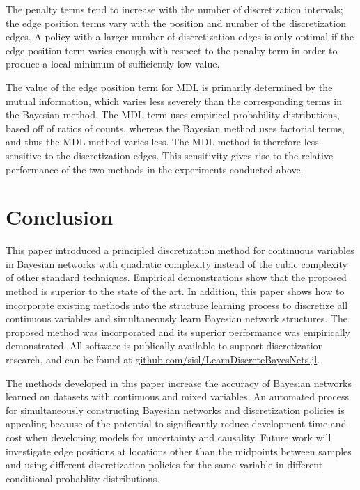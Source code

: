The penalty terms tend to increase with the number of discretization intervals; the edge position terms vary with the position and number of the discretization edges.
A policy with a larger number of discretization edges is only optimal if the edge position term varies enough with respect to the penalty term in order to produce a local minimum of sufficiently low value.

The value of the edge position term for MDL is primarily determined by the mutual information, which varies less severely than the corresponding terms in the Bayesian method.
The MDL term uses empirical probability distributions, based off of ratios of counts, whereas the Bayesian method uses factorial terms, and thus the MDL method varies less.
The MDL method is therefore less sensitive to the discretization edges.
This sensitivity gives rise to the relative performance of the two methods in the experiments conducted above.

\section{Conclusion}
This paper introduced a principled discretization method for continuous variables in Bayesian networks with quadratic complexity instead of the cubic complexity of other standard techniques.
Empirical demonstrations show that the proposed method is superior to the state of the art.
In addition, this paper shows how to incorporate existing methods into the structure learning process to discretize all continuous variables and simultaneously learn Bayesian network structures.
The proposed method was incorporated and its superior performance was empirically demonstrated.
All software is publically available to support discretization research, and can be found at \url{github.com/sisl/LearnDiscreteBayesNets.jl}.

The methods developed in this paper increase the accuracy of Bayesian networks learned on datasets with continuous and mixed variables.
An automated process for simultaneously constructing Bayesian networks and discretization policies is appealing because of the potential to significantly reduce development time and cost when developing models for uncertainty and causality.
Future work will investigate edge positions at locations other than the midpoints between samples and using different discretization policies for the same variable in different conditional probablity distributions.


